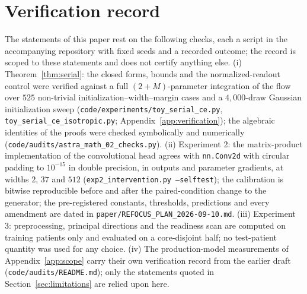 \section{Verification record}
\label{app:audits}
The statements of this paper rest on the following checks, each a script
in the accompanying repository with fixed seeds and a recorded outcome;
the record is scoped to these statements and does not certify anything
else. (i) Theorem~\ref{thm:serial}: the closed forms, bounds and the
normalized-readout control were verified against a full
$(2+M)$-parameter integration of the flow over $525$ non-trivial
initialization--width--margin cases and a $4{,}000$-draw Gaussian
initialization sweep (\texttt{code/experiments/toy\_serial\_ce.py},
\texttt{toy\_serial\_ce\_isotropic.py}; Appendix~\ref{app:verification});
the algebraic identities of the proofs were checked symbolically and
numerically (\texttt{code/audits/astra\_math\_02\_checks.py}). (ii)
Experiment 2: the matrix-product implementation of the convolutional head
agrees with \texttt{nn.Conv2d} with circular padding to $10^{-15}$ in
double precision, in outputs and parameter gradients, at widths $2$, $37$
and $512$ (\texttt{exp2\_intervention.py --selftest}); the calibration is
bitwise reproducible before and after the paired-condition change to the
generator; the pre-registered constants, thresholds, predictions and every
amendment are dated in \texttt{paper/REFOCUS\_PLAN\_2026-09-10.md}.
(iii) Experiment 3: preprocessing, principal directions and the readiness
scan are computed on training patients only and evaluated on a
core-disjoint half; no test-patient quantity was used for any choice.
(iv) The production-model measurements of Appendix~\ref{app:scope} carry
their own verification record from the earlier draft
(\texttt{code/audits/README.md}); only the statements quoted in
Section~\ref{sec:limitations} are relied upon here.
